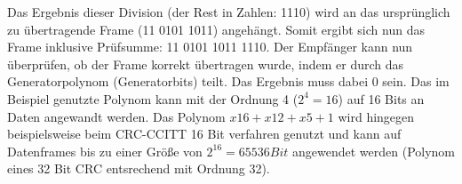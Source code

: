 Das Ergebnis dieser Division (der Rest in Zahlen: 1110) wird an das
urspr{\"u}nglich zu {\"u}bertragende Frame (11 0101 1011) angeh{\"a}ngt. Somit ergibt sich
nun das Frame inklusive Pr{\"u}fsumme: 11 0101 1011 1110. Der
Empf{\"a}nger kann nun {\"u}berpr{\"u}fen, ob der Frame korrekt {\"u}bertragen
wurde, indem er durch das Generatorpolynom (Generatorbits) teilt. Das Ergebnis
muss dabei 0 sein. Das im Beispiel genutzte Polynom kann mit der Ordnung 4
($2^4=16$) auf 16 Bits an Daten angewandt werden. Das Polynom $x16+x12+x5+1$
wird hingegen beispielsweise beim CRC-CCITT 16 Bit verfahren genutzt und
kann auf Datenframes bis zu einer Gr{\"o}{\ss}e von $2^{16}=65536 Bit$
angewendet werden (Polynom eines 32 Bit CRC entsrechend mit Ordnung 32).

